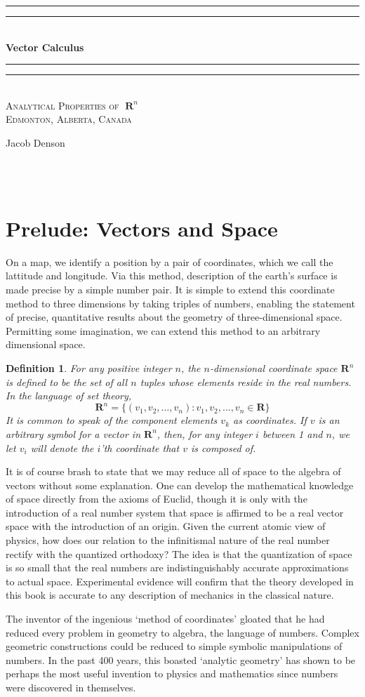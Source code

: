 \documentclass[12pt]{amsbook}
\theoremstyle{plain}
\newtheorem{definition}{Definition}
\theoremstyle{definition}
\DeclareMathOperator{\real}{\mathbf{R}}
\newcommand*{\plogo}{\fbox{$\mathcal{JD}$}} %
\newcommand*{\maketitlepage}{\begingroup %
\centering %
\vspace*{\baselineskip} %

\rule{\textwidth}{1.6pt}\vspace*{-\baselineskip}\vspace*{2pt} %
\rule{\textwidth}{0.4pt}\\[\baselineskip] %

{\bf \Huge Vector Calculus}\\[0.2\baselineskip] %

\rule{\textwidth}{0.4pt}\vspace*{-\baselineskip}\vspace{3.2pt} %
\rule{\textwidth}{1.6pt}\\[\baselineskip] %

\scshape %
\Large
Analytical Properties of $\real^n$\\[\baselineskip] %

\large Edmonton, Alberta, Canada\par %

\vspace*{2\baselineskip} %

{\Huge Jacob Denson\par} %

\vfill %

\plogo \\[0.3\baselineskip] %
{\scshape \the\year} \\[0.3\baselineskip] %

\endgroup}
\begin{document}

\maketitlepage
\tableofcontents

\chapter*{Prelude: Vectors and Space}

On a map, we identify a position by a pair of coordinates, which we call the lattitude and longitude. Via this method, description of the earth's surface is made precise by a simple number pair. It is simple to extend this coordinate method to three dimensions by taking triples of numbers, enabling the statement of precise, quantitative results about the geometry of three-dimensional space. Permitting some imagination, we can extend this method to an arbitrary dimensional space.

\theoremstyle{definition}
\begin{definition}
  For any positive integer $n$, the $n$-dimensional coordinate space $\mathbf{R}^n$ is defined to be the set of all $n$ tuples whose elements reside in the real numbers. In the language of set theory,
  \[ \mathbf{R}^n = \{ (v_1, v_2, \dots, v_n) : v_1, v_2, \dots, v_n \in \mathbf{R} \} \]
  It is common to speak of the component elements $v_k$ as coordinates. If $v$ is an arbitrary symbol for a vector in $\mathbf{R}^n$, then, for any integer $i$ between 1 and $n$, we let $v_i$ will denote the $i$'th coordinate that $v$ is composed of.
\end{definition}
%
It is of course brash to state that we may reduce all of space to the algebra of vectors without some explanation. One can develop the mathematical knowledge of space directly from the axioms of Euclid, though it is only with the introduction of a real number system that space is affirmed to be a real vector space with the introduction of an origin. Given the current atomic view of physics, how does our relation to the infinitismal nature of the real number rectify with the quantized orthodoxy? The idea is that the quantization of space is so small that the real numbers are indistinguishably accurate approximations to actual space. Experimental evidence will confirm that the theory developed in this book is accurate to any description of mechanics in the classical nature.

The inventor of the ingenious `method of coordinates' gloated that he had reduced every problem in geometry to algebra, the language of numbers. Complex geometric constructions could be reduced to simple symbolic manipulations of numbers. In the past 400 years, this boasted `analytic geometry' has shown to be perhaps the most useful invention to physics and mathematics since numbers were discovered in themselves.
\end{document}
